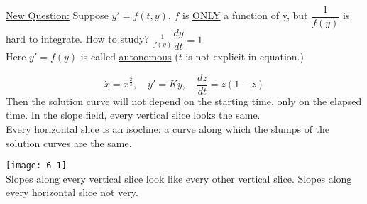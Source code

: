 \underline{\Large New Question:} Suppose $y'=f(t,y)$, $f$ is \underline{ONLY} a function of y, but $\dfrac{1}{f(y)}$ is hard to integrate. How to study? $\boxed{\frac{1}{f(y)} \dfrac{dy}{dt} = 1}$\\
Here $y'=f(y)$ is called \underline{autonomous} ($t$ is not explicit in equation.)
\begin{example-N}
	\begin{equation*}
		\dot{x} = x^{\frac{2}{3}}, \quad y'=Ky, \quad \dfrac{dz}{dt} = z(1-z)
	\end{equation*}
	Then the solution curve will not depend on the starting time, only on the elapsed time. In the slope field, every vertical slice looks the same.\\
	Every horizontal slice is an isocline: a curve along which the slumps of the solution curves are the same.
	\begin{center}
	\texttt{[image: 6-1]}\\
		Slopes along every vertical slice look like every other vertical slice. Slopes along every horizontal slice not very.
	\end{center}
\end{example-N}
